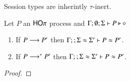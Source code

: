 Session types are inherintly $\tau$-inert.

\begin{lemma}
	\label{lem:tau_inert}
	Let $P$ an $\mathsf{HO}\pi$ process
	and $\Gamma; \emptyset; \Sigma \vdash P \triangleright \diamond$
	\begin{enumerate}
		\item	If $P \longrightarrow P'$ then $\Gamma; \empty; \Sigma \wb \Sigma' \proves P \wb P'$.
		\item	If $P \longrightarrow^* P'$ then $\Gamma; \empty; \Sigma \wb \Sigma' \proves P \wb P'$.
	\end{enumerate}
\end{lemma}

\begin{proof}
\end{proof}


